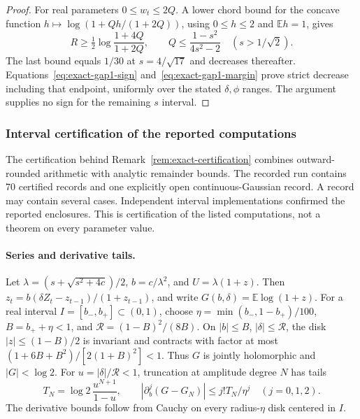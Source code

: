 \begin{proof}
For real parameters \(0\leq w_t\leq2Q\). A lower chord bound for the concave function \(h\mapsto\log(1+Qh/(1+2Q))\), using \(0\leq h\leq2\) and \(\mathbb E h=1\), gives
\begin{equation}\label{eq:exact-gap1-stay}
 R\geq\tfrac12\log\frac{1+4Q}{1+2Q},\qquad
 Q\leq\frac{1-s^2}{4s^2-2}\quad(s>1/\sqrt2).
\end{equation}
The last bound equals \(1/30\) at \(s=4/\sqrt{17}\) and decreases thereafter. Equations~\eqref{eq:exact-gap1-sign} and~\eqref{eq:exact-gap1-margin} prove strict decrease including that endpoint, uniformly over the stated \(\delta,\phi\) ranges. The argument supplies no sign for the remaining \(s\) interval.
\end{proof}

\subsubsection{Interval certification of the reported computations}\label{subsec:exact-app-certification}
The certification behind Remark~\ref{rem:exact-certification} combines outward-rounded arithmetic with analytic remainder bounds. The recorded run contains 70 certified records and one explicitly open continuous-Gaussian record. A record may contain several cases. Independent interval implementations confirmed the reported enclosures. This is certification of the listed computations, not a theorem on every parameter value.

\paragraph{Series and derivative tails.}
Let \(\lambda=(s+\sqrt{s^2+4c})/2\), \(b=c/\lambda^2\), and \(U=\lambda(1+z)\). Then
\(z_t=b(\delta Z_t-z_{t-1})/(1+z_{t-1})\), and write
\(G(b,\delta)=\mathbb E\log(1+z)\).
For a real interval \(I=[b_-,b_+]\subset(0,1)\), choose
\(\eta=\min(b_-,1-b_+)/100\), \(B=b_++\eta<1\), and
\(\mathcal R=(1-B)^2/(8B)\).
On \(|b|\leq B\), \(|\delta|\leq\mathcal R\), the disk
\(|z|\leq(1-B)/2\) is invariant and contracts with factor at most
\((1+6B+B^2)/[2(1+B)^2]<1\). Thus \(G\) is jointly holomorphic and \(|G|<\log2\). For \(u=|\delta|/\mathcal R<1\), truncation at amplitude degree \(N\) has tails
\begin{equation}\label{eq:exact-cert-tails}
 T_N=\log2\,\frac{u^{N+1}}{1-u},\qquad
 |\partial_b^j(G-G_N)|\leq j!T_N/\eta^j\quad(j=0,1,2).
\end{equation}
The derivative bounds follow from Cauchy on every radius-\(\eta\) disk centered in \(I\).


